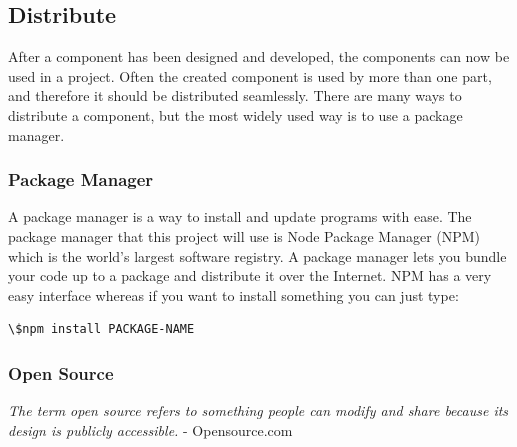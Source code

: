 





\subsection{Distribute}%
\label{sub:Distribute}
After a component has been designed and developed, the components can now be used in a project. Often the created component is used by more than one part, and therefore it should be distributed seamlessly. There are many ways to distribute a component, but the most widely used way is to use a package manager.


\subsubsection{Package Manager}%
\label{sub:Package Manager}
\cite{PackageManager2020} 

A package manager is a way to install and update programs with ease. The package manager that this project will use is Node Package Manager (NPM) which is the world's largest software registry\cite{NpmNpmDocs}. A package manager lets you bundle your code up to a package and distribute it over the Internet. NPM has a very easy interface whereas if you want to install something you can just type: 

\begin{lstlisting}[style=htmlcssjs]
\$npm install PACKAGE-NAME
\end{lstlisting}

\subsubsection{Open Source}%
\label{ssub:Open Source}

\textit{The term open source refers to something people can modify and share because its design is publicly accessible.} - Opensource.com 

